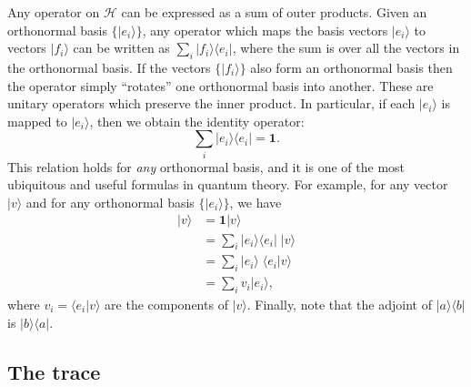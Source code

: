 \documentclass[fleqn]{article}
\begin{document}
Any operator on \(\mathcal{H}\) can be expressed as a sum of outer products. Given an orthonormal basis \(\{|e_i\rangle\}\), any operator which maps the basis vectors \(|e_i\rangle\) to vectors \(|f_i\rangle\) can be written as \(\sum_i|f_i\rangle\langle e_i|\), where the sum is over all the vectors in the orthonormal basis.
If the vectors \(\{|f_i\rangle\}\) also form an orthonormal basis then the operator simply ``rotates'' one orthonormal basis into another.
These are unitary operators which preserve the inner product.
In particular, if each \(|e_i\rangle\) is mapped to \(|e_i\rangle\), then we obtain the identity operator:
\[
  \sum_i|e_i\rangle\langle e_i|=\mathbf{1}.
\]
This relation holds for \emph{any} orthonormal basis, and it is one of the most ubiquitous and useful formulas in quantum theory.
For example, for any vector \(|v\rangle\) and for any orthonormal basis \(\{|e_i\rangle\}\), we have
\[
  \begin{aligned}
    |v\rangle
    &= \mathbf{1}|v\rangle
  \\&= \sum_i |e_i\rangle\langle e_i|\;|v\rangle
  \\&= \sum_i |e_i\rangle\;\langle e_i|v\rangle
  \\&= \sum_i v_i|e_i\rangle,
  \end{aligned}
\]
where \(v_i=\langle e_i|v\rangle\) are the components of \(|v\rangle\).
Finally, note that the adjoint of \(|a\rangle\langle b|\) is \(|b\rangle\langle a|\).

\hypertarget{the-trace}{%
\subsection{The trace}\label{the-trace}}
\end{document}
